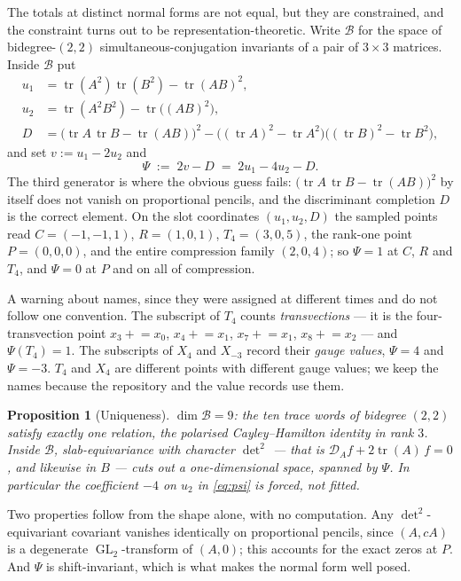 \documentclass[11pt,reqno]{amsart}
\theoremstyle{plain}
\newtheorem{proposition}[theorem]{Proposition}
\theoremstyle{definition}
\DeclareMathOperator{\GL}{GL}
\DeclareMathOperator{\tr}{tr}
\begin{document}
The totals at distinct normal forms are not equal, but they are constrained,
and the constraint turns out to be representation-theoretic.  Write
$\mathcal{B}$ for the space of bidegree-$(2,2)$ simultaneous-conjugation
invariants of a pair of $3\times3$ matrices.  Inside $\mathcal{B}$ put
\[
\begin{aligned}
  u_1 &= \tr(A^{2})\tr(B^{2})-\tr(AB)^{2}, \\
  u_2 &= \tr(A^{2}B^{2})-\tr\big((AB)^{2}\big), \\
  D   &= \big(\tr A\,\tr B-\tr(AB)\big)^{2}
        -\big((\tr A)^{2}-\tr A^{2}\big)\big((\tr B)^{2}-\tr B^{2}\big),
\end{aligned}
\]
and set $v:=u_1-2u_2$ and
\begin{equation}\label{eq:psi}
  \Psi\;:=\;2v-D\;=\;2u_1-4u_2-D .
\end{equation}
The third generator is where the obvious guess fails:
$\big(\tr A\,\tr B-\tr(AB)\big)^{2}$ by itself does not vanish on proportional
pencils, and the discriminant completion $D$ is the correct element.  On the
slot coordinates $(u_1,u_2,D)$ the sampled points read $C=(-1,-1,1)$,
$R=(1,0,1)$, $T_4=(3,0,5)$, the rank-one point $P=(0,0,0)$, and the entire
compression family $(2,0,4)$; so $\Psi=1$ at $C$, $R$ and $T_4$, and $\Psi=0$
at $P$ and on all of compression.

A warning about names, since they were assigned at different times and do not
follow one convention.  The subscript of $T_4$ counts \emph{transvections} ---
it is the four-transvection point $x_3\!+\!=\!x_0$, $x_4\!+\!=\!x_1$,
$x_7\!+\!=\!x_1$, $x_8\!+\!=\!x_2$ --- and $\Psi(T_4)=1$.  The subscripts of
$X_4$ and $X_{-3}$ record their \emph{gauge values}, $\Psi=4$ and $\Psi=-3$.
$T_4$ and $X_4$ are different points with different gauge values; we keep the
names because the repository and the value records use them.

\begin{proposition}[Uniqueness]\label{prop:unique}
$\dim\mathcal{B}=9$: the ten trace words of bidegree $(2,2)$ satisfy exactly
one relation, the polarised Cayley--Hamilton identity in rank $3$.  Inside
$\mathcal B$, slab-equivariance with character $\det^{2}$ --- that is
$\mathcal{D}_{A}f+2\tr(A)\,f=0$, and likewise in $B$ --- cuts out a
\emph{one}-dimensional space, spanned by $\Psi$.  In particular the
coefficient $-4$ on $u_2$ in \eqref{eq:psi} is forced, not fitted.
\end{proposition}

Two properties follow from the shape alone, with no computation.  Any
$\det^{2}$-equivariant covariant vanishes identically on proportional pencils,
since $(A,cA)$ is a degenerate $\GL_2$-transform of $(A,0)$; this accounts for
the exact zeros at $P$.  And $\Psi$ is shift-invariant, which is what makes the
normal form well posed.
\end{document}
